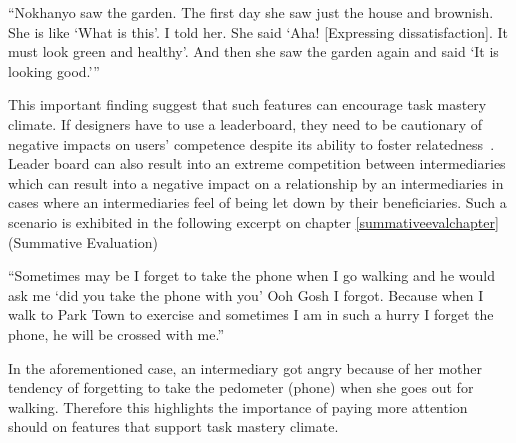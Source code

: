  {``Nokhanyo saw the garden. The first day she saw just the house and brownish. She
is like `What is this'. I told her. She said `Aha! [Expressing
dissatisfaction]. It must look green and healthy'. And then
she saw the garden again and said `It is looking good.'''}

This important finding suggest that such features can encourage task mastery climate. If designers have to use a leaderboard, they need to be cautionary of negative impacts on users' competence despite its ability to foster relatedness~\citep{sailer2013:psychological}. Leader board can also result into an extreme competition between intermediaries which can result into a negative impact on a relationship by an intermediaries in cases where an intermediaries feel of being let down by their beneficiaries. Such a scenario is exhibited in the following excerpt on chapter \ref{summativeevalchapter} (Summative Evaluation)
 
 {``Sometimes may be I forget to take the phone when I go walking and he would ask me `did you take the phone with you' Ooh Gosh I forgot.  Because when I walk to Park Town to exercise and sometimes  I am in such a hurry I forget the phone, he will be crossed with me.''} 

In the aforementioned case, an intermediary got angry because of her mother tendency of forgetting to take the pedometer (phone) when she goes out for walking. Therefore this highlights the importance of paying more attention should on features that support task mastery climate. 
   

\begin{flushright}
\end{flushright}
